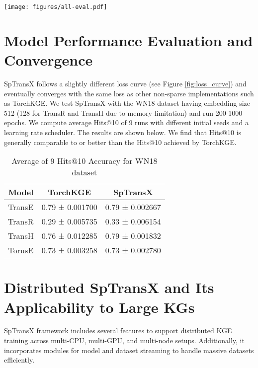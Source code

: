 \begin{figure*}[t]
\centering     %
\texttt{[image: figures/all-eval.pdf]}
\caption{Loss curve for sparse and non-sparse approach. Sparse approach eventually reaches the same loss value with similar Hits@10 test accuracy.}
\label{fig:loss_curve}
\end{figure*}

\section{Model Performance Evaluation and Convergence}
\label{A:eval}
SpTransX follows a slightly different loss curve (see Figure \ref{fig:loss_curve}) and eventually converges with the same loss as other non-sparse implementations such as TorchKGE. We test SpTransX with the WN18 dataset having embedding size 512 (128 for TransR and TransH due to memory limitation) and run 200-1000 epochs. We compute average Hits@10 of 9 runs with different initial seeds and a learning rate scheduler. The results are shown below. We find that Hits@10 is generally comparable to or better than the Hits@10 achieved by TorchKGE.

\begin{table}[h]
\centering
\caption{Average of 9 Hits@10 Accuracy for WN18 dataset}
\begin{tabular}{|c|c|c|}
\hline
\textbf{Model} & \textbf{TorchKGE} & \textbf{SpTransX} \\ \hline
TransE         & 0.79 ± 0.001700   & 0.79 ± 0.002667   \\ \hline
TransR         & 0.29 ± 0.005735   & 0.33 ± 0.006154   \\ \hline
TransH         & 0.76 ± 0.012285   & 0.79 ± 0.001832   \\ \hline
TorusE         & 0.73 ± 0.003258   & 0.73 ± 0.002780   \\ \hline
\end{tabular}
\label{table:perf_eval}
\end{table}


\section{Distributed SpTransX and Its Applicability to Large KGs}
\label{A:dist}
SpTransX framework includes several features to support distributed KGE training across multi-CPU, multi-GPU, and multi-node setups. Additionally, it incorporates modules for model and dataset streaming to handle massive datasets efficiently. 

